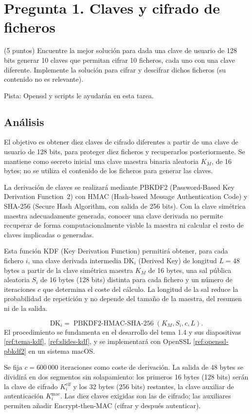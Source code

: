 \section{Pregunta 1. Claves y cifrado de ficheros}
\label{sec:pregunta1}

\begin{enunciado}{(5 puntos)}
Encuentre la mejor solución para dada una clave de usuario de 128 bits generar 10 claves que permitan cifrar 10 ficheros, cada uno con una clave diferente. Implemente la solución para cifrar y descifrar dichos ficheros (su contenido no es relevante).

Pista: Openssl y scripts le ayudarán en esta tarea.
\end{enunciado}

\subsection{Análisis}

El objetivo es obtener diez claves de cifrado diferentes a partir de una clave de usuario de 128 bits, para proteger diez ficheros y recuperarlos posteriormente. Se mantiene como secreto inicial una clave maestra binaria aleatoria $K_M$, de 16 bytes; no se utiliza el contenido de los ficheros para generar las claves.

La derivación de claves se realizará mediante PBKDF2 (Password-Based Key Derivation Function~2) con HMAC (Hash-based Message Authentication Code) y SHA-256 (Secure Hash Algorithm, con salida de 256 bits).
Con la clave simétrica maestra adecuadamente generada, conocer una clave derivada no permite recuperar de forma computacionalmente viable la maestra ni calcular el resto de claves implicadas o generadas.

Esta función KDF (Key Derivation Function) permitirá obtener, para cada fichero $i$, una clave derivada intermedia $\mathrm{DK}_i$ (Derived Key) de longitud $L=48$ bytes a partir de la clave simétrica maestra $K_M$ de 16 bytes, una sal pública aleatoria $S_i$ de 16 bytes (128 bits) distinta para cada fichero y un número de iteraciones $c$ que determina el coste del cálculo. La longitud de la sal reduce la probabilidad de repetición y no depende del tamaño de la maestra, del resumen ni de la salida.

\begin{samepage}
\[
  \mathrm{DK}_i=\operatorname{PBKDF2\text{-}HMAC\text{-}SHA\text{-}256}
  (K_M,S_i,c,L).
\]
El procedimiento se fundamenta en el desarrollo del tema 1.4 y sus diapositivas \ref{ref:tema-kdf}, \ref{ref:slides-kdf}, y se implementará con OpenSSL \ref{ref:openssl-pbkdf2} en un sistema macOS.
\end{samepage}
Se fija $c=600\,000$ iteraciones como coste de derivación. La salida de 48 bytes se dividirá en dos segmentos sin solapamiento: los primeros 16 bytes (128 bits) serán la clave de cifrado $K_i^{\mathrm{cif}}$ y los 32 bytes (256 bits) restantes, la clave auxiliar de autenticación $K_i^{\mathrm{mac}}$. Las diez claves exigidas son las de cifrado; las auxiliares permiten añadir Encrypt-then-MAC (cifrar y después autenticar).

